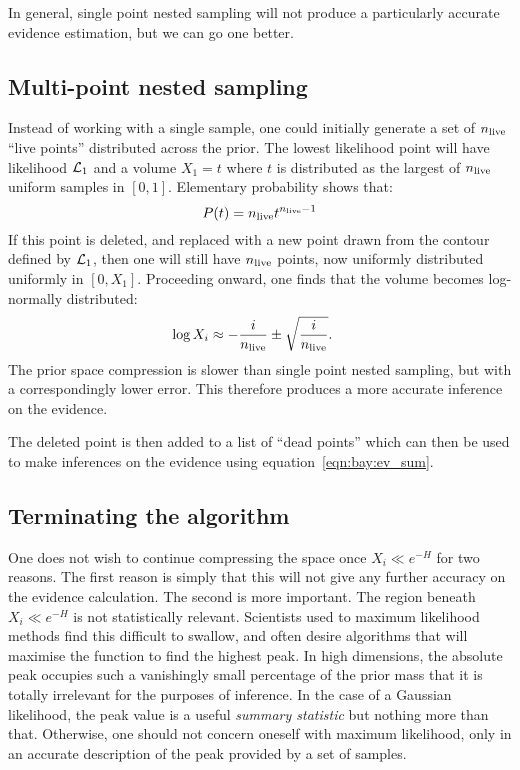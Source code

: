 In general, single point nested sampling will not produce a particularly accurate evidence estimation, but we can go one better.


\subsection{Multi-point nested sampling}
Instead of working with a single sample, one could initially generate a set of $n_{\mathrm{live}}$ ``live points'' distributed across the prior. The lowest likelihood point will have likelihood $\mathcal{L}_1$ and a volume $X_1 = t$ where $t$ is distributed as the largest of $n_{\mathrm{live}}$ uniform samples in $[0,1]$. Elementary probability shows that:
\begin{equation}
  P(t) = n_{\mathrm{live}} t^{n_{\mathrm{live}}-1}
  \label{eqn:bay:t_prob}
\end{equation}
If this point is deleted, and replaced with a new point drawn from the contour defined by $\mathcal{L}_1$, then one will still have $n_{\mathrm{live}}$ points, now uniformly distributed uniformly in $[0,X_1]$. Proceeding onward, one finds that the volume becomes log-normally distributed:
\begin{align}
  \log X_i  &\approx -\frac{i}{n_{\mathrm{live}}} \pm \sqrt{\frac{i}{n_{\mathrm{live}}}}.
  \label{eqn:bay:log_normal_1_n}
\end{align}
The prior space compression is slower than single point nested sampling, but with a correspondingly lower error. This therefore produces a more accurate inference on the evidence.

The deleted point is then added to a list of ``dead points'' which can then be used to make inferences on the evidence using equation~\eqref{eqn:bay:ev_sum}.

\subsection{Terminating the algorithm}
One does not wish to continue compressing the space once $X_i\ll e^{-H}$ for two reasons. The first reason is simply that this will not give any further accuracy on the evidence calculation. The second is more important. The region beneath $X_i\ll e^{-H}$ is not statistically relevant. Scientists used to maximum likelihood methods find this difficult to swallow, and often desire algorithms that will maximise the function to find the highest peak. In high dimensions, the absolute peak occupies such a vanishingly small percentage of the prior mass that it is totally irrelevant for the purposes of inference. In the case of a Gaussian likelihood, the peak value is a useful {\em summary statistic\/} but nothing more than that. Otherwise, one should not concern oneself with maximum likelihood, only in an accurate description of the peak provided by a set of samples.

